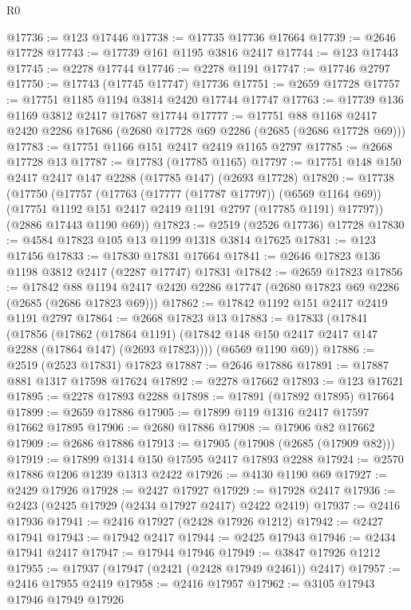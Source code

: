 \begin{lexlean}{R0}
\begin{coremodule}
@17736 := @123 @17446
@17738 := @17735 @17736 @17664
@17739 := @2646 @17728
@17743 := @17739 @161 @1195 @3816 @2417
@17744 := @123 @17443
@17745 := @2278 @17744
@17746 := @2278 @1191
@17747 := @17746 @2797
@17750 := @17743 (@17745 @17747) @17736
@17751 := @2659 @17728
@17757 := @17751 @1185 @1194 @3814 @2420 @17744 @17747
@17763 := @17739 @136 @1169 @3812 @2417 @17687 @17744
@17777 := @17751
    @88
    @1168
    @2417
    @2420
    @2286
    @17686
    (@2680 @17728 @69 @2286 (@2685 (@2686 @17728 @69)))
@17783 := @17751 @1166 @151 @2417 @2419 @1165 @2797
@17785 := @2668 @17728 @13
@17787 := @17783 (@17785 @1165)
@17797 := @17751 @148 @150 @2417 @2417 @147 @2288 (@17785 @147) (@2693 @17728)
@17820 := @17738
    (@17750
      (@17757
        (@17763 (@17777 (@17787 @17797)) (@6569 @1164 @69))
        (@17751 @1192 @151 @2417 @2419 @1191 @2797 (@17785 @1191) @17797))
      (@2886 @17443 @1190 @69))
@17823 := @2519 (@2526 @17736) @17728
@17830 := @4584 @17823 @105 @13 @1199 @1318 @3814 @17625
@17831 := @123 @17456
@17833 := @17830 @17831 @17664
@17841 := @2646 @17823 @136 @1198 @3812 @2417 (@2287 @17747) @17831
@17842 := @2659 @17823
@17856 := @17842
    @88
    @1194
    @2417
    @2420
    @2286
    @17747
    (@2680 @17823 @69 @2286 (@2685 (@2686 @17823 @69)))
@17862 := @17842 @1192 @151 @2417 @2419 @1191 @2797
@17864 := @2668 @17823 @13
@17883 := @17833
    (@17841
      (@17856
        (@17862
          (@17864 @1191)
          (@17842 @148 @150 @2417 @2417 @147 @2288 (@17864 @147) (@2693 @17823))))
      (@6569 @1190 @69))
@17886 := @2519 (@2523 @17831) @17823
@17887 := @2646 @17886
@17891 := @17887 @881 @1317 @17598 @17624
@17892 := @2278 @17662
@17893 := @123 @17621
@17895 := @2278 @17893 @2288
@17898 := @17891 (@17892 @17895) @17664
@17899 := @2659 @17886
@17905 := @17899 @119 @1316 @2417 @17597 @17662 @17895
@17906 := @2680 @17886
@17908 := @17906 @82 @17662
@17909 := @2686 @17886
@17913 := @17905 (@17908 (@2685 (@17909 @82)))
@17919 := @17899 @1314 @150 @17595 @2417 @17893 @2288
@17924 := @2570 @17886 @1206 @1239 @1313 @2422
@17926 := @4130 @1190 @69
@17927 := @2429 @17926
@17928 := @2427 @17927
@17929 := @17928 @2417
@17936 := @2423 (@2425 @17929 (@2434 @17927 @2417) @2422 @2419)
@17937 := @2416 @17936
@17941 := @2416 @17927 (@2428 @17926 @1212)
@17942 := @2427 @17941
@17943 := @17942 @2417
@17944 := @2425 @17943
@17946 := @2434 @17941 @2417
@17947 := @17944 @17946
@17949 := @3847 @17926 @1212
@17955 := @17937 (@17947 (@2421 (@2428 @17949 @2461)) @2417)
@17957 := @2416 @17955 @2419
@17958 := @2416 @17957
@17962 := @3105 @17943 @17946 @17949 @17926

\end{coremodule}
\end{lexlean}
